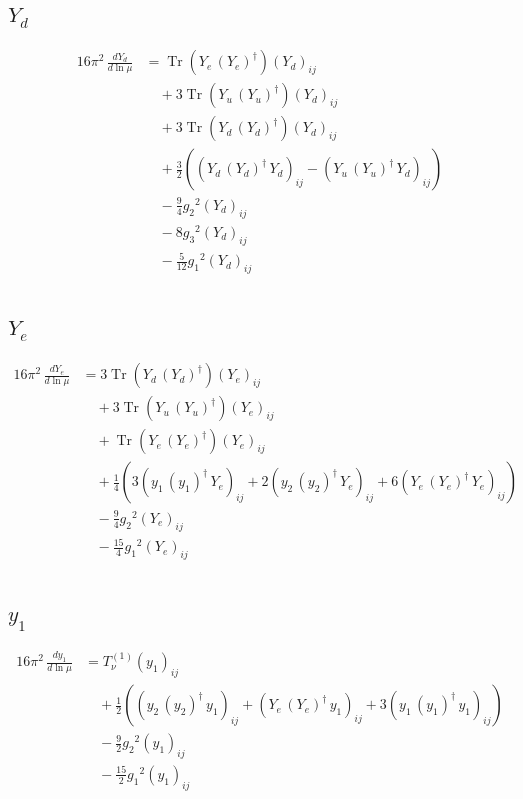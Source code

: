 \documentclass[10pt,a4paper]{article}
\begin{document}
\subsection*{$Y_d$}
\begin{align*}
16\pi^2\,\frac{d Y_d}{d\ln\mu} &=\operatorname{Tr}\!\left({Y_e}\,\left({Y_e}\right)^{\dagger}\right) \left({Y_d}\right)_{ij} \\
&\quad +3 \operatorname{Tr}\!\left({Y_u}\,\left({Y_u}\right)^{\dagger}\right) \left({Y_d}\right)_{ij} \\
&\quad +3 \operatorname{Tr}\!\left({Y_d}\,\left({Y_d}\right)^{\dagger}\right) \left({Y_d}\right)_{ij} \\
&\quad +\frac{3}{2} (\left({Y_d}\,\left({Y_d}\right)^{\dagger}\,{Y_d}\right)_{ij}-\left({Y_u}\,\left({Y_u}\right)^{\dagger}\,{Y_d}\right)_{ij}) \\
&\quad -\frac{9}{4} {g_2}^2 \left({Y_d}\right)_{ij} \\
&\quad -8 {g_3}^2 \left({Y_d}\right)_{ij} \\
&\quad -\frac{5}{12} {g_1}^2 \left({Y_d}\right)_{ij} \\
\end{align*}
\subsection*{$Y_e$}
\begin{align*}
16\pi^2\,\frac{d Y_e}{d\ln\mu} &=3 \operatorname{Tr}\!\left({Y_d}\,\left({Y_d}\right)^{\dagger}\right) \left({Y_e}\right)_{ij} \\
&\quad +3 \operatorname{Tr}\!\left({Y_u}\,\left({Y_u}\right)^{\dagger}\right) \left({Y_e}\right)_{ij} \\
&\quad +\operatorname{Tr}\!\left({Y_e}\,\left({Y_e}\right)^{\dagger}\right) \left({Y_e}\right)_{ij} \\
&\quad +\frac{1}{4} (3 \left({y_1}\,\left({y_1}\right)^{\dagger}\,{Y_e}\right)_{ij}+2 \left({y_2}\,\left({y_2}\right)^{\dagger}\,{Y_e}\right)_{ij}+6 \left({Y_e}\,\left({Y_e}\right)^{\dagger}\,{Y_e}\right)_{ij}) \\
&\quad -\frac{9}{4} {g_2}^2 \left({Y_e}\right)_{ij} \\
&\quad -\frac{15}{4} {g_1}^2 \left({Y_e}\right)_{ij} \\
\end{align*}
\subsection*{$y_1$}
\begin{align*}
16\pi^2\,\frac{d y_1}{d\ln\mu} &=T_{\nu}^{(1)} \left({y_1}\right)_{ij} \\
&\quad +\frac{1}{2} (\left({y_2}\,\left({y_2}\right)^{\dagger}\,{y_1}\right)_{ij}+\left({Y_e}\,\left({Y_e}\right)^{\dagger}\,{y_1}\right)_{ij}+3 \left({y_1}\,\left({y_1}\right)^{\dagger}\,{y_1}\right)_{ij}) \\
&\quad -\frac{9}{2} {g_2}^2 \left({y_1}\right)_{ij} \\
&\quad -\frac{15}{2} {g_1}^2 \left({y_1}\right)_{ij} \\
\end{align*}
\end{document}
